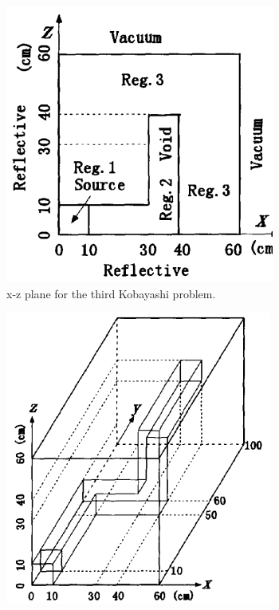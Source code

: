 \begin{figure}[H]
    \centering
    \begin{subfigure}[b]{0.45\textwidth}
        \centering
        \includegraphics[width=\textwidth]{images/verification/sn_kobayashi/geometry/3_geo_1.png}
        \caption{x-z plane for the third Kobayashi problem.}
        \label{fig:verification:sn_kobayashi_3_geo:1}
    \end{subfigure}
    \hfill
    \begin{subfigure}[b]{0.45\textwidth}
        \centering
        \includegraphics[width=\textwidth]{images/verification/sn_kobayashi/geometry/3_geo_2.png}

\end{subfigure}
\end{figure}
